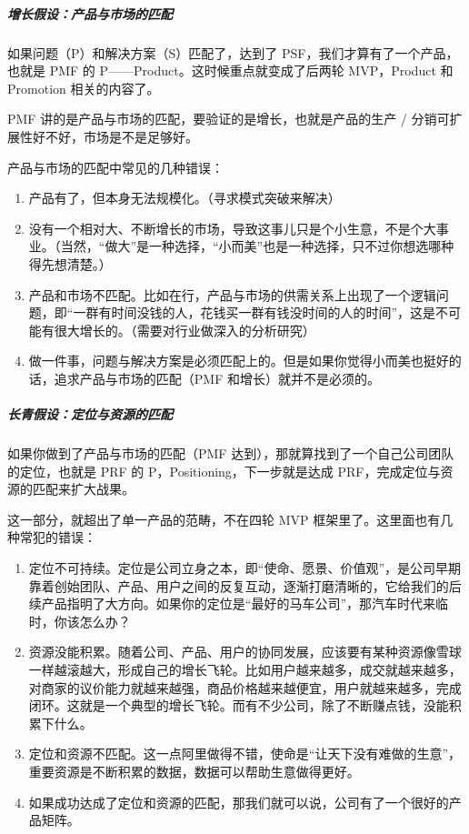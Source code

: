 \documentclass[letterpaper,11pt,english]{sphinxmanual}
\begin{document}
\subparagraph{增长假设：产品与市场的匹配}
\label{\detokenize{chapter_introduction/Product:id35}}
如果问题（P）和解决方案（S）匹配了，达到了
PSF，我们才算有了一个产品，也就是 PMF 的
P——Product。这时候重点就变成了后两轮 MVP，Product 和 Promotion
相关的内容了。

PMF 讲的是产品与市场的匹配，要验证的是增长，也就是产品的生产 /
分销可扩展性好不好，市场是不是足够好。

产品与市场的匹配中常见的几种错误：
\begin{enumerate}
%
\item {} 
产品有了，但本身无法规模化。（寻求模式突破来解决）

\item {} 
没有一个相对大、不断增长的市场，导致这事儿只是个小生意，不是个大事业。（当然，“做大”是一种选择，“小而美”也是一种选择，只不过你想选哪种得先想清楚。）

\item {} 
产品和市场不匹配。比如在行，产品与市场的供需关系上出现了一个逻辑问题，即“一群有时间没钱的人，花钱买一群有钱没时间的人的时间”，这是不可能有很大增长的。（需要对行业做深入的分析研究）

\item {} 
做一件事，问题与解决方案是必须匹配上的。但是如果你觉得小而美也挺好的话，追求产品与市场的匹配（PMF
和增长）就并不是必须的。

\end{enumerate}


\subparagraph{长青假设：定位与资源的匹配}
\label{\detokenize{chapter_introduction/Product:id36}}
如果你做到了产品与市场的匹配（PMF
达到），那就算找到了一个自己公司团队的定位，也就是 PRF 的
P，Positioning，下一步就是达成 PRF，完成定位与资源的匹配来扩大战果。

这一部分，就超出了单一产品的范畴，不在四轮 MVP
框架里了。这里面也有几种常犯的错误：
\begin{enumerate}
%
\item {} 
定位不可持续。定位是公司立身之本，即“使命、愿景、价值观”，是公司早期靠着创始团队、产品、用户之间的反复互动，逐渐打磨清晰的，它给我们的后续产品指明了大方向。如果你的定位是“最好的马车公司”，那汽车时代来临时，你该怎么办？

\item {} 
资源没能积累。随着公司、产品、用户的协同发展，应该要有某种资源像雪球一样越滚越大，形成自己的增长飞轮。比如用户越来越多，成交就越来越多，对商家的议价能力就越来越强，商品价格越来越便宜，用户就越来越多，完成闭环。这就是一个典型的增长飞轮。而有不少公司，除了不断赚点钱，没能积累下什么。

\item {} 
定位和资源不匹配。这一点阿里做得不错，使命是“让天下没有难做的生意”，重要资源是不断积累的数据，数据可以帮助生意做得更好。

\item {} 
如果成功达成了定位和资源的匹配，那我们就可以说，公司有了一个很好的产品矩阵。

\end{enumerate}
\end{document}

